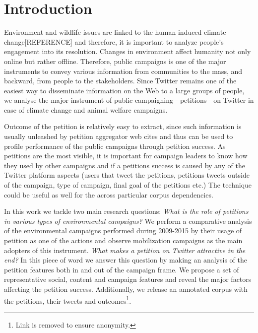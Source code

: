 \section{Introduction}
\label{sec:intro}

Environment and wildlife issues are linked to the human-induced climate change[REFERENCE] and therefore, it is important to analyze people's engagement into its resolution.
%
Changes in environment affect humanity not only online but rather offline. Therefore, public campaigns is one of the major instruments to convey various information from communities to the mass, and backward, from people to the stakeholders.
%
Since Twitter remains one of the easiest way to disseminate information on the Web to a large groups of people, we analyse the major instrument of public campaigning - petitions - on Twitter in case of climate change and animal welfare campaigns.

%
Outcome of the petition is relatively easy to extract, since such information is usually unleashed by petition aggregator web cites and thus can be used to profile performance of the public campaigns through petition success.
As petitions are the most visible, it is important for campaign leaders to know how they used by other campaigns and if a petitions success is caused by any of the Twitter platform aspects (users that tweet the petitions, petitions tweets outside of the campaign, type of campaign, final goal of the petitions etc.)
The technique could be useful as well for the across particular corpus dependencies.

In this work we tackle two main research questions: 
\textit{What is the role of petitions in various types of environmental campaigns?} We perform a comparative analysis of the environmental campaigns performed during 2009-2015 by their usage of petition as one of the actions and observe mobilization campaigns as the main adopters of this instrument.
\textit{What makes a petition on Twitter attractive in the end?} In this piece of word we answer this question by making an analysis of the petition features both in and out of the campaign frame. We propose a set of representative social, content and campaign features and reveal the major factors affecting the petition success. Additionally, we release an annotated corpus with the petitions, their tweets and outcomes\footnote{Link is removed to ensure anonymity.}. 

